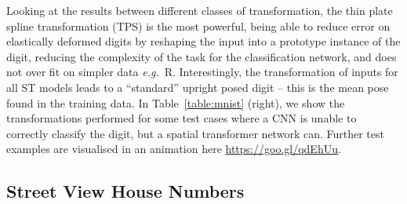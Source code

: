 \documentclass{article} %
\newcommand{\tblref}[1]{Table~\ref{#1}}
\def\eg{\emph{e.g.}}
\begin{document}
Looking at the results between different classes of transformation, the
thin plate spline transformation (TPS) is the most powerful, being able to
reduce error on elastically deformed digits by reshaping the input into a
prototype instance of the digit, reducing the complexity of the task for the
classification network, and does not over fit on simpler data \eg~R. Interestingly, the transformation of inputs for all ST
models leads to a ``standard'' upright posed digit -- this is the mean pose found in the training data. In \tblref{table:mnist} (right), we show the transformations performed for some test cases where a CNN is unable to correctly classify the digit, but a
spatial transformer network can. Further test examples are visualised in an animation here \url{https://goo.gl/qdEhUu}.

\subsection{Street View House Numbers}\label{sec:svhn}
\end{document}
